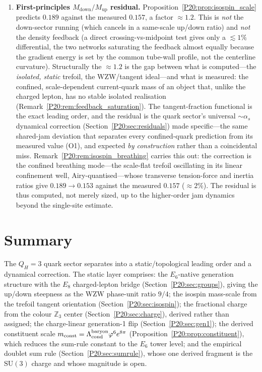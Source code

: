 \documentclass[11pt,a4paper]{article}
\theoremstyle{definition}\newtheorem{definition}[theorem]{Definition}
\theoremstyle{remark}
\newcommand{\vp}{\varphi}
\newcommand{\Lcond}{\Lambda_{\mathrm{cond}}}
\newcommand{\SU}{\mathrm{SU}}
\newcommand{\QH}{Q_H}
\newcommand{\Zthree}{\mathbb{Z}_3}
\newcommand{\Mup}{M_{\mathrm{up}}}
\newcommand{\Mdn}{M_{\mathrm{down}}}
\newcommand{\alphas}{\alpha_s}
\begin{document}
\begin{enumerate}[leftmargin=2em,label=\textbf{O\arabic*.}]
\item \textbf{First-principles $\Mdn/\Mup$ residual.}
Proposition~\ref{P20:prop:isospin_scale} predicts $0.189$ against the
measured $0.157$, a factor $\approx1.2$. This is \emph{not} the down-sector
running (which cancels in a same-scale up/down ratio) and \emph{not} the
density feedback (a direct crossing-vs-midpoint test gives only a
$\lesssim1\%$ differential, the two networks saturating the feedback almost
equally because the gradient energy is set by the common tube-wall profile,
not the centerline curvature). Structurally the $\approx1.2$ is the gap
between what is computed---the \emph{isolated, static} trefoil, the
WZW/tangent ideal---and what is measured: the confined, scale-dependent
current-quark mass of an object that, unlike the charged lepton, has no
stable isolated realisation (Remark~\ref{P20:rem:feedback_saturation}). The
tangent-fraction functional is the exact leading order, and the residual is
the quark sector's universal $\sim\!\alphas$ dynamical correction
(Section~\ref{P20:sec:residuals}) made specific---the same shared-jam
deviation that separates every confined-quark prediction from its measured
value (O1), and expected \emph{by construction} rather than a coincidental
miss. Remark~\ref{P20:rem:isospin_breathing} carries this out: the correction
is the confined breathing mode---the scale-flat trefoil oscillating in its
linear confinement well, Airy-quantised---whose transverse tension-force and
inertia ratios give $0.189\to0.153$ against the measured $0.157$ ($\approx2\%$).
The residual is thus computed, not merely sized, up to the higher-order jam
dynamics beyond the single-site estimate.

\end{enumerate}

\section{Summary}
\label{P20:sec:summary}

The $\QH=3$ quark sector separates into a static/topological leading
order and a dynamical correction. The static layer comprises: the
$E_6$-native generation structure with the $E_8$ charged-lepton bridge
(Section~\ref{P20:sec:groups}), giving the up/down steepness as the WZW
phase-unit ratio $9/4$; the isospin mass-scale from the trefoil tangent
orientation (Section~\ref{P20:sec:isospin}); the fractional charge from
the colour $\Zthree$ center (Section~\ref{P20:sec:charge}), derived
rather than assigned; the charge-linear generation-1 flip
(Section~\ref{P20:sec:gen1}); the derived constituent scale
$m_{\rm const}=\Lcond^{\rm baryon}\vp^6 e^{8\pi}$
(Proposition~\ref{P20:prop:constituent}), which reduces the sum-rule
constant to the $E_6$ tower level; and the empirical
doublet sum rule (Section~\ref{P20:sec:sumrule}), whose one derived
fragment is the $\SU(3)$ charge and whose magnitude is open.
\end{document}
